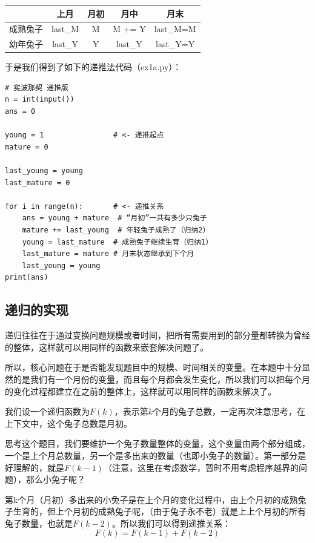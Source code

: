 \documentclass{article}
\begin{document}
\begin{table}[htbp]
    \centering
    \Large
    \begin{tabular}{|c|c|c|c|c|}
        \hline
             & 上月      & 月初 & 月中      & 月末        \\ \hline
        成熟兔子 & last\_M & M  & M += Y  & last\_M=M \\ \hline
        幼年兔子 & last\_Y & Y  & last\_Y & last\_Y=Y \\ \hline
        \end{tabular}
\end{table}

于是我们得到了如下的递推法代码（ex1a.py）：
\begin{lstlisting}
# 斐波那契 递推版
n = int(input())
ans = 0

young = 1                # <- 递推起点
mature = 0

last_young = young
last_mature = 0

for i in range(n):       # <- 递推关系
    ans = young + mature  # “月初”一共有多少只兔子
    mature += last_young  # 年轻兔子成熟了（归纳2）
    young = last_mature  # 成熟兔子继续生育（归纳1）
    last_mature = mature # 月末状态继承到下个月
    last_young = young
print(ans)
\end{lstlisting}

\subsection{递归的实现}\label{recursive}

递归往往在于通过变换问题规模或者时间，把所有需要用到的部分量都转换为曾经的整体，这样就可以用同样的函数来嵌套解决问题了。

所以，核心问题在于是否能发现题目中的规模、时间相关的变量。在本题中十分显然的是我们有一个月份的变量，而且每个月都会发生变化，所以我们可以把每个月的变化过程都建立在之前的整体上，这样就可以用同样的函数来解决了。

我们设一个递归函数为$F(k)$，表示第$k$个月的兔子总数，一定再次注意思考，在上下文中，这个兔子总数是月初。

思考这个题目，我们要维护一个兔子数量整体的变量，这个变量由两个部分组成，一个是上个月总数量，另一个是多出来的数量（也即小兔子的数量）。第一部分是好理解的，就是$F(k-1)$（注意，这里在考虑数学，暂时不用考虑程序越界的问题），那么小兔子呢？

第k个月（月初）多出来的小兔子是在上个月的变化过程中，由上个月初的成熟兔子生育的，但上个月初的成熟兔子呢，（由于兔子永不老）就是上上个月初的所有兔子数量，也就是$F(k-2)$。所以我们可以得到递推关系：
\begin{equation}
    F(k) = F(k-1) + F(k-2)
\end{equation}
\end{document}
